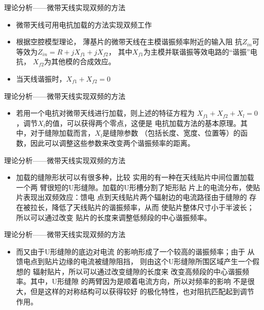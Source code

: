 \documentclass[10pt]{beamer}
\begin{document}
\begin{frame}{理论分析——{\normalsize 微带天线实现双频的方法}}
	\begin{itemize}
		\item 微带天线可用{\Large 电抗加载}的方法实现双频工作\pause
		\item 根据空腔模型理论，
		薄基片的微带天线在主模谐振频率附近的输入阻
		抗$Z_{in}$可等效为$Z_{in}=R+jX_{f1}+jX_{f2}$，
		其中$X_{f1}$为主模并联谐振等效电路的“谐振”电抗，
		$X_{f2}$为其他模的合成效应。\pause
		\item 当天线谐振时，$X_{f1}+X_{f2}=0$
	\end{itemize}
	
\end{frame}
\begin{frame}{理论分析——{\normalsize 微带天线实现双频的方法}}
	\begin{itemize}
		\item 若用一个电抗对微带天线进行加载，则上述的特征方程为
		$X_{f1}+X_{f2}+X_{l}=0$，调节$X_l$的值，可以获得两个零点，这便是
		电抗加载方法的基本原理。其中，对于缝隙加载而言，$X_l$是缝隙参数
		（包括长度、宽度、位置等）的函数，因此可以调整这些参数来改变两个谐振频率的距离。
		\end{itemize}
\end{frame}


\begin{frame}{理论分析——{\normalsize 微带天线实现双频的方法}}
	\begin{itemize}
		\item 加载的缝隙形状可以有很多种，比较
		实用的有一种在天线贴片中间位置加载一个两
		臂很短的U形缝隙。加载的U形槽分割了矩形贴
		片上的电流分布，使贴片表现出双频效应：馈电
		点到天线贴片两个辐射边的电流路径由于缝隙的
		存在被拉长，降低了天线贴片的谐振频率，从而
		使贴片整体尺寸小于半波长；所以可以通过改变
		贴片的长度来调整低频段的中心谐振频率。
	\end{itemize}
\end{frame}
\begin{frame}{理论分析——{\normalsize 微带天线实现双频的方法}}
	\begin{itemize}
		\item 而又由于U形缝隙的底边对电流
		的影响形成了一个较高的谐振频率；由于
		从馈电点到贴片边缘的电流被缝隙阻挡，
		则由这个U形缝隙所围区域产生一个假想的
		辐射贴片，所以可以通过改变缝隙的长度来
		改变高频段的中心谐振频率。其中，U形缝隙
		的两臂因为是顺着电流方向，所以对频率的影响
		不是很大，但是这样的对称结构可以获得较好
		的极化特性，也对阻抗匹配起到调节作用。
		\end{itemize}
\end{frame}
\end{document}

